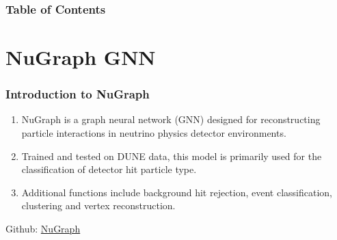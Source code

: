 \documentclass{beamer}
\title{\subtitle{Binary Classification Model for Decay Events}}
\author{Prince Bhaura, Yijie Wang, Murdock Aubry}
\institute{University of Toronto}
\date{\today}
\begin{document}
\frame{\titlepage}

\begin{frame}
	\frametitle{Table of Contents}
	\tableofcontents
\end{frame}





\section{NuGraph GNN}

\begin{frame}
	\frametitle{Introduction to NuGraph}
		\begin{enumerate} 
			\item NuGraph is a graph neural network (GNN) designed for reconstructing particle interactions in neutrino physics detector environments.

			\item Trained and tested on DUNE data, this model is primarily used for the classification of detector hit particle type.

   			\item Additional functions include background hit rejection, event classification, clustering and vertex reconstruction.
		\end{enumerate}

		\centering
		\vspace{\fill}
		Github: \href{https://github.com/exatrkx/NuGraph/tree/main}{\color{blue} NuGraph}
\end{frame}

\end{document}
